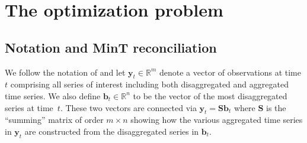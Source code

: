 \documentclass[11pt]{article}
\newcommand{\0}{\phantom{0}}
\begin{document}

\section{The optimization problem}

\subsection{Notation and MinT reconciliation}

We follow the notation of \citet{Wick2018} and let $\bm{y}_t \in \mathbb{R}^m$ denote a vector of observations at time $t$ comprising all series of interest including both disaggregated and aggregated time series. We also define $\bm{b}_t \in \mathbb{R}^n$ to be the vector of the most disaggregated series at time~$t$. These two vectors are connected via $\bm{y}_t=\bm{S}\bm{b}_t$ where $\bm{S}$ is the ``summing'' matrix of order $m \times n$ showing how the various aggregated time series in $\bm{y}_t$ are constructed from the disaggregated series in $\bm{b}_t$.
\end{document}
